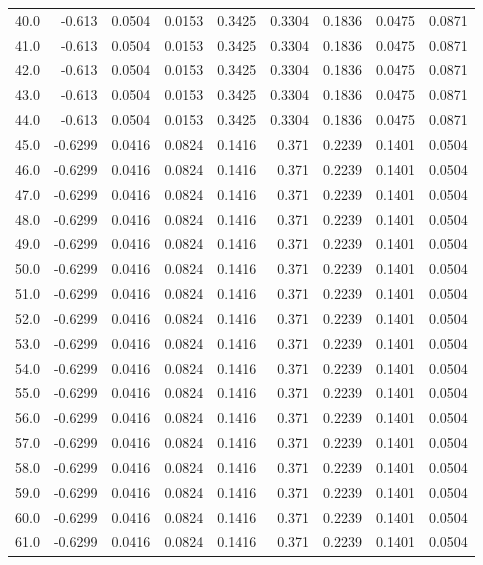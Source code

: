 \begin{longtable}{lrrrrrrrr}
40.0 & -0.613 & 0.0504 & 0.0153 & 0.3425 & 0.3304 & 0.1836 & 0.0475 & 0.0871 \\
41.0 & -0.613 & 0.0504 & 0.0153 & 0.3425 & 0.3304 & 0.1836 & 0.0475 & 0.0871 \\
42.0 & -0.613 & 0.0504 & 0.0153 & 0.3425 & 0.3304 & 0.1836 & 0.0475 & 0.0871 \\
43.0 & -0.613 & 0.0504 & 0.0153 & 0.3425 & 0.3304 & 0.1836 & 0.0475 & 0.0871 \\
44.0 & -0.613 & 0.0504 & 0.0153 & 0.3425 & 0.3304 & 0.1836 & 0.0475 & 0.0871 \\
45.0 & -0.6299 & 0.0416 & 0.0824 & 0.1416 & 0.371 & 0.2239 & 0.1401 & 0.0504 \\
46.0 & -0.6299 & 0.0416 & 0.0824 & 0.1416 & 0.371 & 0.2239 & 0.1401 & 0.0504 \\
47.0 & -0.6299 & 0.0416 & 0.0824 & 0.1416 & 0.371 & 0.2239 & 0.1401 & 0.0504 \\
48.0 & -0.6299 & 0.0416 & 0.0824 & 0.1416 & 0.371 & 0.2239 & 0.1401 & 0.0504 \\
49.0 & -0.6299 & 0.0416 & 0.0824 & 0.1416 & 0.371 & 0.2239 & 0.1401 & 0.0504 \\
50.0 & -0.6299 & 0.0416 & 0.0824 & 0.1416 & 0.371 & 0.2239 & 0.1401 & 0.0504 \\
51.0 & -0.6299 & 0.0416 & 0.0824 & 0.1416 & 0.371 & 0.2239 & 0.1401 & 0.0504 \\
52.0 & -0.6299 & 0.0416 & 0.0824 & 0.1416 & 0.371 & 0.2239 & 0.1401 & 0.0504 \\
53.0 & -0.6299 & 0.0416 & 0.0824 & 0.1416 & 0.371 & 0.2239 & 0.1401 & 0.0504 \\
54.0 & -0.6299 & 0.0416 & 0.0824 & 0.1416 & 0.371 & 0.2239 & 0.1401 & 0.0504 \\
55.0 & -0.6299 & 0.0416 & 0.0824 & 0.1416 & 0.371 & 0.2239 & 0.1401 & 0.0504 \\
56.0 & -0.6299 & 0.0416 & 0.0824 & 0.1416 & 0.371 & 0.2239 & 0.1401 & 0.0504 \\
57.0 & -0.6299 & 0.0416 & 0.0824 & 0.1416 & 0.371 & 0.2239 & 0.1401 & 0.0504 \\
58.0 & -0.6299 & 0.0416 & 0.0824 & 0.1416 & 0.371 & 0.2239 & 0.1401 & 0.0504 \\
59.0 & -0.6299 & 0.0416 & 0.0824 & 0.1416 & 0.371 & 0.2239 & 0.1401 & 0.0504 \\
60.0 & -0.6299 & 0.0416 & 0.0824 & 0.1416 & 0.371 & 0.2239 & 0.1401 & 0.0504 \\
61.0 & -0.6299 & 0.0416 & 0.0824 & 0.1416 & 0.371 & 0.2239 & 0.1401 & 0.0504 \\

\end{longtable}
